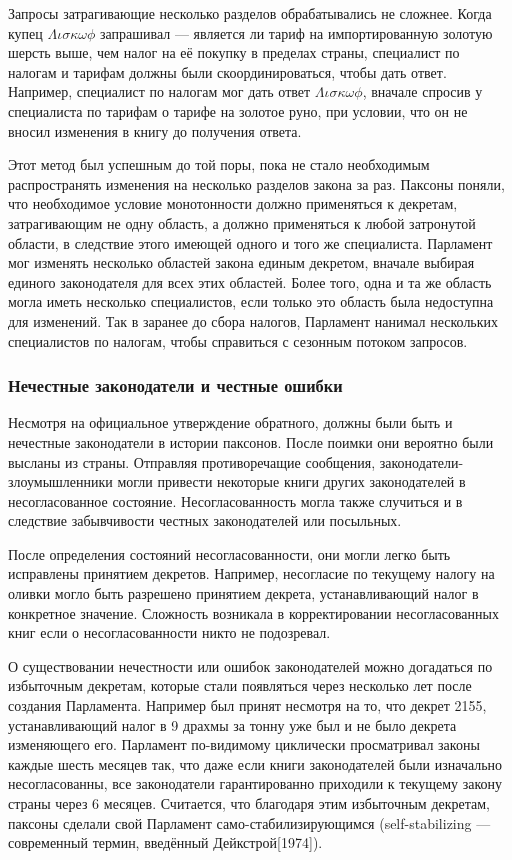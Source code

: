 \documentclass[12pt, a4paper]{article} %
\begin{document}
Запросы затрагивающие несколько разделов обрабатывались не сложнее. Когда купец $\Lambda\iota\sigma\kappa\omega\phi$ запрашивал --- является ли тариф на импортированную золотую шерсть выше, чем налог на её покупку в пределах страны, специалист по налогам и тарифам должны были скоординироваться, чтобы дать ответ. Например, специалист по налогам мог дать ответ $\Lambda\iota\sigma\kappa\omega\phi$, вначале спросив у специалиста по тарифам о тарифе на золотое руно, при условии, что он не вносил изменения в книгу до получения ответа.

Этот метод был успешным до той поры, пока не стало необходимым распространять изменения на несколько разделов закона за раз. Паксоны поняли, что необходимое условие монотонности должно применяться к декретам, затрагивающим не одну область, а должно применяться к любой затронутой области, в следствие этого имеющей одного и того же специалиста. Парламент мог изменять несколько областей закона единым декретом, вначале выбирая единого законодателя для всех этих областей. Более того, одна и та же область могла иметь несколько специалистов, если только это область была недоступна для изменений. Так в заранее до сбора налогов, Парламент нанимал нескольких специалистов по налогам, чтобы справиться с сезонным потоком запросов.

\subsubsection{Нечестные законодатели и честные ошибки}\label{sec:evilorholy}

Несмотря на официальное утверждение обратного, должны были быть и нечестные законодатели в истории паксонов. После поимки они вероятно были высланы из страны. Отправляя противоречащие сообщения, законодатели-злоумышленники могли привести некоторые книги других законодателей в несогласованное состояние. Несогласованность могла также случиться и в следствие забывчивости честных законодателей или посыльных.

После определения состояний несогласованности, они могли легко быть исправлены принятием декретов. Например, несогласие по текущему налогу на оливки могло быть разрешено принятием декрета, устанавливающий налог в конкретное значение. Сложность возникала в корректировании несогласованных книг если о несогласованности никто не подозревал. 

О существовании нечестности или ошибок законодателей можно догадаться по избыточным декретам, которые стали появляться через несколько лет после создания Парламента. Например
был принят несмотря на то, что декрет 2155, устанавливающий налог в 9 драхмы за тонну уже был и не было декрета изменяющего его. Парламент по-видимому циклически просматривал законы каждые шесть месяцев так, что даже если книги законодателей были изначально несогласованны, все законодатели гарантированно приходили к текущему закону страны через 6 месяцев. Считается, что благодаря этим избыточным декретам, паксоны сделали свой Парламент само-стабилизирующимся (self-stabilizing --- современный термин, введённый Дейкстрой[1974]).
\end{document}
